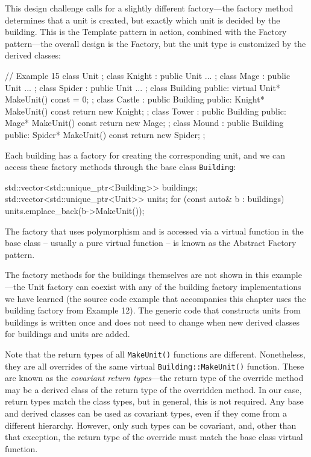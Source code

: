 This design challenge calls for a slightly different factory---the factory method determines that a unit is created, but exactly which unit is decided by the building. This is the Template pattern in action, combined with the Factory pattern---the overall design is the Factory, but the unit type is customized by the derived classes:

\begin{code}
// Example 15
class Unit {};
class Knight : public Unit { ... };
class Mage : public Unit { ... };
class Spider : public Unit { ... };
class Building {
  public:
  virtual Unit* MakeUnit() const = 0;
};
class Castle : public Building {
  public:
  Knight* MakeUnit() const { return new Knight; }
};
class Tower : public Building {
  public:
  Mage* MakeUnit() const { return new Mage; }
};
class Mound : public Building {
  public:
  Spider* MakeUnit() const { return new Spider; }
};
\end{code}

Each building has a factory for creating the corresponding unit, and we can access these factory methods through the base class \texttt{Building}:

\begin{code}
std::vector<std::unique_ptr<Building>> buildings;
std::vector<std::unique_ptr<Unit>> units;
for (const auto& b : buildings) {
  units.emplace_back(b->MakeUnit());
}
\end{code}

The factory that uses polymorphism and is accessed via a virtual function in the base class -- usually a pure virtual function -- is known as the Abstract Factory pattern.

The factory methods for the buildings themselves are not shown in this example---the Unit factory can coexist with any of the building factory implementations we have learned (the source code example that accompanies this chapter uses the building factory from Example 12). The generic code that constructs units from buildings is written once and does not need to change when new derived classes for buildings and units are added.

Note that the return types of all \texttt{MakeUnit()} functions are different. Nonetheless, they are all overrides of the same virtual \texttt{Building::MakeUnit()} function. These are known as the \emph{covariant return types}---the return type of the override method may be a derived class of the return type of the overridden method. In our case, return types match the class types, but in general, this is not required. Any base and derived classes can be used as covariant types, even if they come from a different hierarchy. However, only such types can be covariant, and, other than that exception, the return type of the override must match the base class virtual function.

